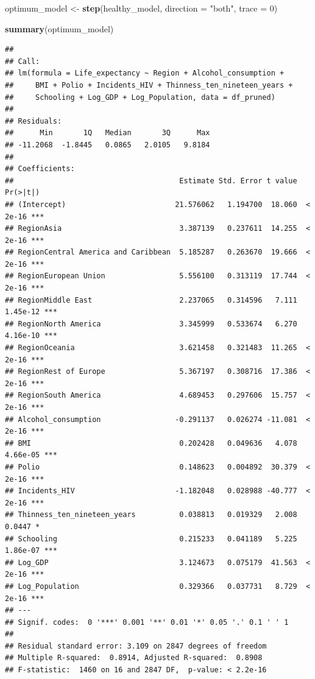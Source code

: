 \documentclass[
  10pt,
]{article}
\newenvironment{Shaded}{\begin{snugshade}}{\end{snugshade}}
\newcommand{\AttributeTok}[1]{\textcolor[rgb]{0.13,0.29,0.53}{#1}}
\newcommand{\DecValTok}[1]{\textcolor[rgb]{0.00,0.00,0.81}{#1}}
\newcommand{\FunctionTok}[1]{\textcolor[rgb]{0.13,0.29,0.53}{\textbf{#1}}}
\newcommand{\NormalTok}[1]{#1}
\newcommand{\OtherTok}[1]{\textcolor[rgb]{0.56,0.35,0.01}{#1}}
\newcommand{\StringTok}[1]{\textcolor[rgb]{0.31,0.60,0.02}{#1}}
\begin{document}
\begin{Shaded}
\begin{Highlighting}[]
\NormalTok{optimum\_model }\OtherTok{\textless{}{-}} \FunctionTok{step}\NormalTok{(healthy\_model, }\AttributeTok{direction =} \StringTok{"both"}\NormalTok{, }\AttributeTok{trace =} \DecValTok{0}\NormalTok{)}

\FunctionTok{summary}\NormalTok{(optimum\_model)}
\end{Highlighting}
\end{Shaded}

\begin{verbatim}
## 
## Call:
## lm(formula = Life_expectancy ~ Region + Alcohol_consumption + 
##     BMI + Polio + Incidents_HIV + Thinness_ten_nineteen_years + 
##     Schooling + Log_GDP + Log_Population, data = df_pruned)
## 
## Residuals:
##      Min       1Q   Median       3Q      Max 
## -11.2068  -1.8445   0.0865   2.0105   9.8184 
## 
## Coefficients:
##                                      Estimate Std. Error t value Pr(>|t|)    
## (Intercept)                         21.576062   1.194700  18.060  < 2e-16 ***
## RegionAsia                           3.387139   0.237611  14.255  < 2e-16 ***
## RegionCentral America and Caribbean  5.185287   0.263670  19.666  < 2e-16 ***
## RegionEuropean Union                 5.556100   0.313119  17.744  < 2e-16 ***
## RegionMiddle East                    2.237065   0.314596   7.111 1.45e-12 ***
## RegionNorth America                  3.345999   0.533674   6.270 4.16e-10 ***
## RegionOceania                        3.621458   0.321483  11.265  < 2e-16 ***
## RegionRest of Europe                 5.367197   0.308716  17.386  < 2e-16 ***
## RegionSouth America                  4.689453   0.297606  15.757  < 2e-16 ***
## Alcohol_consumption                 -0.291137   0.026274 -11.081  < 2e-16 ***
## BMI                                  0.202428   0.049636   4.078 4.66e-05 ***
## Polio                                0.148623   0.004892  30.379  < 2e-16 ***
## Incidents_HIV                       -1.182048   0.028988 -40.777  < 2e-16 ***
## Thinness_ten_nineteen_years          0.038813   0.019329   2.008   0.0447 *  
## Schooling                            0.215233   0.041189   5.225 1.86e-07 ***
## Log_GDP                              3.124673   0.075179  41.563  < 2e-16 ***
## Log_Population                       0.329366   0.037731   8.729  < 2e-16 ***
## ---
## Signif. codes:  0 '***' 0.001 '**' 0.01 '*' 0.05 '.' 0.1 ' ' 1
## 
## Residual standard error: 3.109 on 2847 degrees of freedom
## Multiple R-squared:  0.8914, Adjusted R-squared:  0.8908 
## F-statistic:  1460 on 16 and 2847 DF,  p-value: < 2.2e-16
\end{verbatim}
\end{document}

